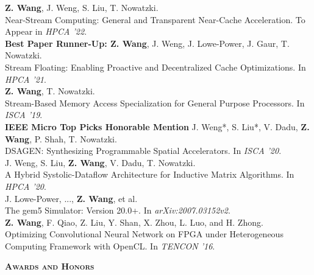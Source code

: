 \documentclass[a4paper]{article}
\newenvironment{changemargin}[2]{%
  \begin{list}{}{%
    \setlength{\topsep}{0pt}%
    \setlength{\leftmargin}{#1}%
    \setlength{\rightmargin}{#2}%
    \setlength{\listparindent}{\parindent}%
    \setlength{\itemindent}{\parindent}%
    \setlength{\parsep}{\parskip}%
  }%
  \item[]}{\end{list}
}
\newcommand{\lineover}{
	\begin{changemargin}{-0.05in}{-0.05in}
		\vspace*{-8pt}
		\hrulefill \\
		\vspace*{-2pt}
	\end{changemargin}
}
\newcommand{\header}[1]{
	\begin{changemargin}{-0.5in}{-0.5in}
		\scshape{\textbf{#1}}\\
  	\lineover
	\end{changemargin}
}
\newenvironment{body} {
	\vspace*{-16pt}
	\begin{changemargin}{-0.25in}{-0.5in}
  }	
	{\end{changemargin}
}
\begin{document}
\begin{body}
	\vspace{14pt}
	\textbf{Z. Wang}, J. Weng, S. Liu, T. Nowatzki. \\
	Near-Stream Computing: General and Transparent Near-Cache Acceleration. To Appear in \emph{HPCA '22}.\\
	\smallskip
	\textbf{Best Paper Runner-Up: Z. Wang}, J. Weng, J. Lowe-Power, J. Gaur, T. Nowatzki. \\
	Stream Floating: Enabling Proactive and Decentralized Cache Optimizations. In \emph{HPCA '21}.\\
	\smallskip
	\textbf{Z. Wang}, T. Nowatzki. \\
	Stream-Based Memory Access Specialization for General Purpose Processors. In \emph{ISCA '19}.\\
	\smallskip
	\textbf{IEEE Micro Top Picks Honorable Mention} J. Weng*, S. Liu*, V. Dadu, \textbf{Z. Wang}, P. Shah, T. Nowatzki. \\
	DSAGEN: Synthesizing Programmable Spatial Accelerators. In \emph{ISCA '20}.\\
	\smallskip
	J. Weng, S. Liu, \textbf{Z. Wang}, V. Dadu, T. Nowatzki. \\
	A Hybrid Systolic-Dataflow Architecture for Inductive Matrix Algorithms. In \emph{HPCA '20}.\\
	\smallskip
	J. Lowe-Power, ..., \textbf{Z. Wang}, et al. \\
	The gem5 Simulator: Version 20.0+. In \emph{arXiv:2007.03152v2}.\\
	\smallskip
	\textbf{Z. Wang}, F. Qiao, Z. Liu, Y. Shan, X. Zhou, L. Luo, and H. Zhong. \\
	Optimizing Convolutional Neural Network on FPGA under Heterogeneous Computing Framework with OpenCL. In \emph{TENCON '16}.\\
\end{body}

\smallskip
\smallskip


\header{Awards and Honors}
\end{document}

